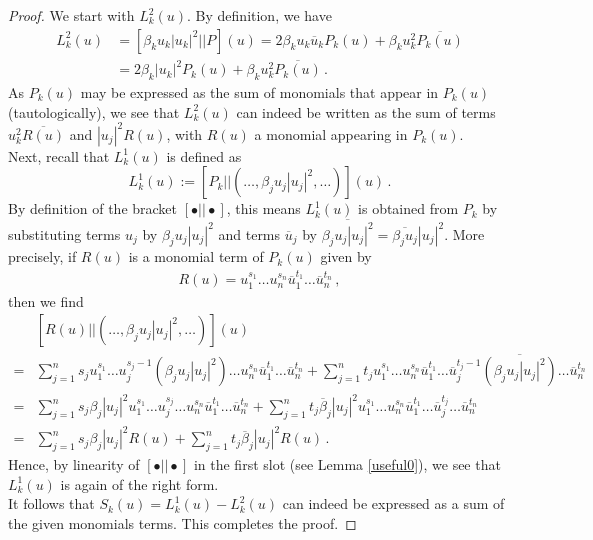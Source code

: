 \documentclass[12pt]{article}
\theoremstyle{plain}
\theoremstyle{definition}
\theoremstyle{remark}
\theoremstyle{remark}
\begin{document}
\begin{proof}
We start with $L^2_k(u)$. By definition, we have
\begin{align}
    L^2_k(u) &=  [\beta_k u_k |u_k|^2|| P](u) = 2\beta_k u_k\overline{u}_kP_k(u) + \beta_k u_k^2\overline{P_k(u)} \\ \nonumber
    &=  2\beta_k |u_k|^2P_k(u) + \beta_k u_k^2\overline{P_k(u)}\, .
\end{align}
As $P_k(u)$ may be expressed as the sum of monomials that appear in $P_k(u)$ (tautologically), we see that $ L^2_k(u)$  can indeed be written as the sum of terms $u_k^2\overline{R(u)}$ and  $|u_j|^2R(u)$, with $R(u)$ a monomial appearing in $P_k(u)$. \\


 Next, recall that $L^1_k(u)$ is defined as
\begin{equation}
    L^1_k(u) :=  [P_k|| (\dots, \beta_j u_j|u_j|^2, \dots)](u)\, .
\end{equation}
By definition of the bracket $[\bullet|| \bullet]$, this means $L^1_k(u)$ is obtained from $P_k$ by substituting terms $u_j$ by $\beta_j u_j|u_j|^2$ and terms $\overline{u}_j$ by $\overline{\beta_j u_j|u_j|^2} = \overline{\beta_j u_j}|u_j|^2$. More precisely, if $R(u)$ is a monomial term of $P_k(u)$ given by
\begin{align}
    R(u) = u_1^{s_1}\dots  u_n^{s_n} \overline{u}_1^{t_1} \dots \overline{u}_n^{t_n}\, ,
\end{align}
then we find
\begin{align}
    &[R(u)|| (\dots, \beta_j u_j|u_j|^2, \dots)](u)\\ \nonumber
    = &\sum_{j=1}^n s_j u_1^{s_1} \dots   u_j^{s_j-1}(\beta_j u_j|u_j|^2)  \dots  u_n^{s_n} \overline{u}_1^{t_1} \dots \overline{u}_n^{t_n} 
    + \sum_{j=1}^n t_j u_1^{s_1} \dots  u_n^{s_n} \overline{u}_1^{t_1} \dots    \overline{u}_j^{t_j-1}\overline{(\beta_j u_j|u_j|^2)}  \dots  \overline{u}_n^{t_n} \\ \nonumber
     = &\sum_{j=1}^n s_j\beta_j |u_j|^2 u_1^{s_1} \dots   u_j^{s_j}  \dots  u_n^{s_n} \overline{u}_1^{t_1} \dots \overline{u}_n^{t_n}    + \sum_{j=1}^n t_j \overline{\beta}_j|u_j|^2 u_1^{s_1} \dots  u_n^{s_n} \overline{u}_1^{t_1} \dots    \overline{u}_j^{t_j}  \dots  \overline{u}_n^{t_n} \\ \nonumber
    = &\sum_{j=1}^n s_j\beta_j |u_j|^2 R(u)
    + \sum_{j=1}^n t_j \overline{\beta}_j|u_j|^2 R(u) \, .
\end{align}
Hence, by linearity of $[\bullet|| \bullet]$ in the first slot (see Lemma \ref{useful0}), we see that $L^1_k(u)$ is again of the right form.\\


 It follows that $S_k(u) = L^1_k(u) - L^2_k(u)$ can indeed be expressed as a sum of the given monomials terms. This completes the proof.
\end{proof}
\end{document}
